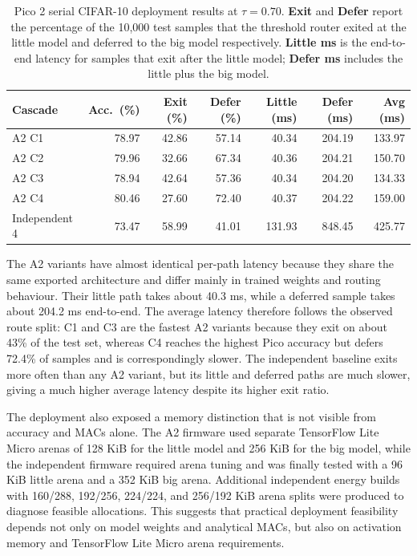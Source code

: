 \documentclass[conference]{IEEEtran}
\begin{document}
\begin{table}[t]
\centering
\caption{Pico 2 serial CIFAR-10 deployment results at $\tau=0.70$.
\textbf{Exit} and \textbf{Defer} report the percentage of the 10{,}000 test
samples that the threshold router exited at the little model and deferred to
the big model respectively. \textbf{Little ms} is the end-to-end latency for
samples that exit after the little model; \textbf{Defer ms} includes the
little plus the big model.}
\label{tab:pico-deployment}
\small
\begin{tabular}{@{}lrrrrrr@{}}
\toprule
\textbf{Cascade} & \textbf{Acc.\ (\%)} & \textbf{Exit (\%)} & \textbf{Defer (\%)} &
\textbf{Little (ms)} & \textbf{Defer (ms)} & \textbf{Avg (ms)} \\
\midrule
A2 C1            & 78.97 & 42.86 & 57.14 & 40.34 & 204.19 & 133.97 \\
A2 C2            & 79.96 & 32.66 & 67.34 & 40.36 & 204.21 & 150.70 \\
A2 C3            & 78.94 & 42.64 & 57.36 & 40.34 & 204.20 & 134.33 \\
A2 C4            & 80.46 & 27.60 & 72.40 & 40.37 & 204.22 & 159.00 \\
Independent 4    & 73.47 & 58.99 & 41.01 & 131.93 & 848.45 & 425.77 \\
\bottomrule
\end{tabular}
\end{table}

The A2 variants have almost identical per-path latency because they share
the same exported architecture and differ mainly in trained weights and routing
behaviour. Their little path takes about 40.3 ms, while a deferred sample takes
about 204.2 ms end-to-end. The average latency therefore follows the observed
route split: C1 and C3 are the fastest A2 variants because they exit on
about 43\% of the test set, whereas C4 reaches the highest Pico accuracy but
defers 72.4\% of samples and is correspondingly slower. The independent
baseline exits more often than any A2 variant, but its little and deferred
paths are much slower, giving a much higher average latency despite its higher
exit ratio.

The deployment also exposed a memory distinction that is not visible from
accuracy and MACs alone. The A2 firmware used separate TensorFlow Lite
Micro arenas of 128 KiB for the little model and 256 KiB for the big model,
while the independent firmware required arena tuning and was finally tested
with a 96 KiB little arena and a 352 KiB big arena. Additional independent
energy builds with 160/288, 192/256, 224/224, and 256/192 KiB arena splits
were produced to diagnose feasible allocations. This suggests that practical
deployment feasibility depends not only on model weights and analytical MACs,
but also on activation memory and TensorFlow Lite Micro arena requirements.
\end{document}
